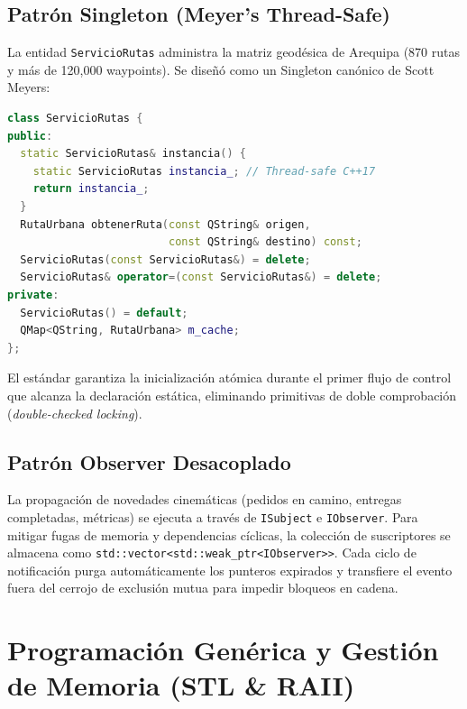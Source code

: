\documentclass[conference]{IEEEtran}
\begin{document}
\subsection{Patrón Singleton (Meyer's Thread-Safe)}
La entidad \texttt{ServicioRutas} administra la matriz geodésica de Arequipa (870 rutas y más de 120,000 waypoints). Se diseñó como un Singleton canónico de Scott Meyers:
\begin{lstlisting}[language=C++]
class ServicioRutas {
public:
  static ServicioRutas& instancia() {
    static ServicioRutas instancia_; // Thread-safe C++17
    return instancia_;
  }
  RutaUrbana obtenerRuta(const QString& origen, 
                         const QString& destino) const;
  ServicioRutas(const ServicioRutas&) = delete;
  ServicioRutas& operator=(const ServicioRutas&) = delete;
private:
  ServicioRutas() = default;
  QMap<QString, RutaUrbana> m_cache;
};
\end{lstlisting}
El estándar garantiza la inicialización atómica durante el primer flujo de control que alcanza la declaración estática, eliminando primitivas de doble comprobación (\textit{double-checked locking}).

\subsection{Patrón Observer Desacoplado}
La propagación de novedades cinemáticas (pedidos en camino, entregas completadas, métricas) se ejecuta a través de \texttt{ISubject} e \texttt{IObserver}. Para mitigar fugas de memoria y dependencias cíclicas, la colección de suscriptores se almacena como \lstinline|std::vector<std::weak_ptr<IObserver>>|. Cada ciclo de notificación purga automáticamente los punteros expirados y transfiere el evento fuera del cerrojo de exclusión mutua para impedir bloqueos en cadena.

\section{Programación Genérica y Gestión de Memoria (STL \& RAII)}
\end{document}
